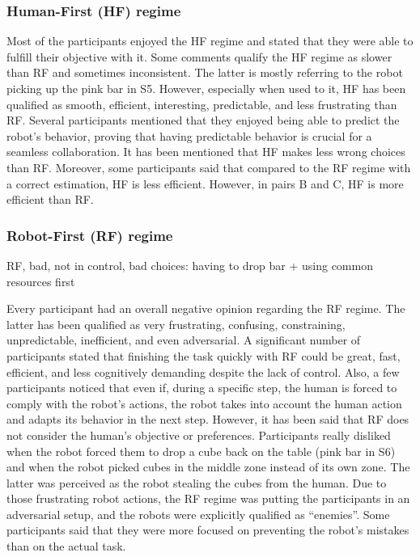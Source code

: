 \subsubsection{Human-First (HF) regime}
Most of the participants enjoyed the HF regime and stated that they were able to fulfill their objective with it. Some comments qualify the HF regime as slower than RF and sometimes inconsistent. The latter is mostly referring to the robot picking up the pink bar in S5. However, especially when used to it, HF has been qualified as smooth, efficient, interesting, predictable, and less frustrating than RF. Several participants mentioned that they enjoyed being able to predict the robot's behavior, proving that having predictable behavior is crucial for a seamless collaboration. It has been mentioned that HF makes less wrong choices than RF.
Moreover, some participants said that compared to the RF regime with a correct estimation, HF is less efficient. However, in pairs B and C, HF is more efficient than RF.

\subsubsection{Robot-First (RF) regime}
RF, bad, not in control, bad choices: having to drop bar + using common resources first

Every participant had an overall negative opinion regarding the RF regime. The latter has been qualified as very frustrating, confusing, constraining, unpredictable, inefficient, and even adversarial. A significant number of participants stated that finishing the task quickly with RF could be great, fast, efficient, and less cognitively demanding despite the lack of control. Also, a few participants noticed that even if, during a specific step, the human is forced to comply with the robot's actions, the robot takes into account the human action and adapts its behavior in the next step. 
However, it has been said that RF does not consider the human's objective or preferences. Participants really disliked when the robot forced them to drop a cube back on the table (pink bar in S6) and when the robot picked cubes in the middle zone instead of its own zone. The latter was perceived as the robot stealing the cubes from the human.
Due to those frustrating robot actions, the RF regime was putting the participants in an adversarial setup, and the robots were explicitly qualified as ``enemies''. Some participants said that they were more focused on preventing the robot's mistakes than on the actual task.


